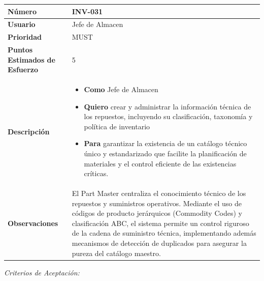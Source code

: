 \begin{longtable}{|p{0.21\textwidth}|p{0.74\textwidth}|}\hline
\textbf{Número} & INV-031 \\ \hline
\textbf{Usuario} & Jefe de Almacen \\ \hline
\textbf{Prioridad} & MUST \\ \hline
\textbf{Puntos Estimados de Esfuerzo} & 5 \\ \hline
\textbf{Descripción} & \parbox[t]{\linewidth}{\vspace{2pt}\begin{itemize}[leftmargin=1.5em, nosep, topsep=0pt]
\item \textbf{Como} Jefe de Almacen
\item \textbf{Quiero} crear y administrar la información técnica de los repuestos, incluyendo su clasificación, taxonomía y política de inventario
\item \textbf{Para} garantizar la existencia de un catálogo técnico único y estandarizado que facilite la planificación de materiales y el control eficiente de las existencias críticas.
\end{itemize}\vspace{2pt}} \\ \hline
\textbf{Observaciones} & El Part Master centraliza el conocimiento técnico de los repuestos y suministros operativos. Mediante el uso de códigos de producto jerárquicos (Commodity Codes) y clasificación ABC, el sistema permite un control riguroso de la cadena de suministro técnica, implementando además mecanismos de detección de duplicados para asegurar la pureza del catálogo maestro. \\ \hline
\end{longtable}\normalsize
\noindent\textit{Criterios de Aceptación:}
